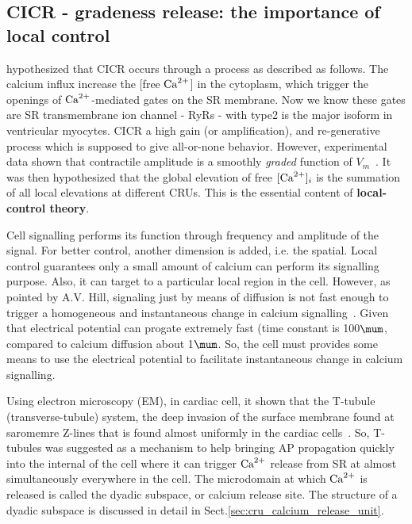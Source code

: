 \subsection{CICR - gradeness release: the importance of local control}
\label{sec:local_control}



\cite{fabiato1983cir} hypothesized that CICR occurs  through a process as
described as follows. The calcium influx increase the [free ${\text{Ca}^{2+}}$] in the
cytoplasm, which trigger the openings of  ${\text{Ca}^{2+}}$-mediated gates on the SR
membrane.
Now we know these gates are SR transmembrane ion channel - RyRs - with type2 is
the major isoform in ventricular myocytes. CICR a high gain (or amplification),
and re-generative process which is supposed to give all-or-none behavior.
However, experimental data shown that contractile amplitude is a smoothly {\it
graded} function of $V_m$~\citep{new1972}. It was then hypothesized that the
global elevation of free $[{\text{Ca}^{2+}}]_i$ is the summation of all local elevations at
different CRUs. This is the essential content of {\bf local-control theory}.

Cell signalling performs its function through frequency and amplitude of the
signal. For better control, another dimension is added, i.e. the spatial. Local
control guarantees only a small amount of calcium can perform its signalling
purpose. Also, it can target to a particular local region in the cell. However,
as pointed by A.V. Hill, signaling just by means of diffusion is not fast enough
to trigger a homogeneous and instantaneous change in calcium
signalling~\citep{hill1910pea, hill1949}. Given that electrical potential can
progate extremely fast (time constant is 100$\mum$, compared to calcium
diffusion about 1$\mum$. So, the cell must provides some means to use the
electrical potential to facilitate instantaneous change in calcium signalling. 

Using electron microscopy (EM), in cardiac cell, it shown that the T-tubule
(transverse-tubule) system, the deep invasion of the surface membrane found at
saromemre Z-lines that is found almost uniformly in the cardiac
cells~\citep{endo1964, porter1957}. So, T-tubules was suggested as a mechanism
to help bringing AP propagation quickly into the internal of the cell where it
can trigger ${\text{Ca}^{2+}}$ release from SR at almost simultaneously everywhere in the
cell. The microdomain at which ${\text{Ca}^{2+}}$ is released is called the dyadic subspace,
or calcium release site. The structure of a dyadic subspace is discussed in
detail in Sect.\ref{sec:cru_calcium_release_unit}. 

